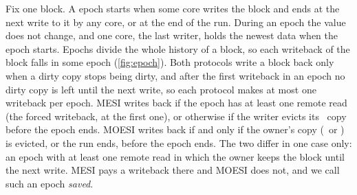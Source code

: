 Fix one block. A \gls{epoch} starts when some core writes the
block and ends at the next write to it by any core, or at the end of the run.
During an epoch the value does not change, and one core, the last writer, holds the
newest data when the epoch starts. Epochs divide the whole history of a block, so
each writeback of the block falls in some epoch (\cref{fig:epoch}). Both protocols
write a block back only when a dirty copy stops being dirty, and after the first
writeback in an epoch no dirty copy is left until the next write, so each protocol
makes at most one writeback per epoch. MESI writes back if the epoch has at least
one remote read (the forced writeback, at the first one), or otherwise if the
writer evicts its \stM\ copy before the epoch ends. MOESI writes back if and only if
the owner's copy (\stM\ or \stO) is evicted, or the run ends, before the epoch ends.
The two differ in one case only: an epoch with at least one remote read in which
the owner keeps the block until the next write. MESI pays a writeback there and
MOESI does not, and we call such an epoch \emph{saved}.

